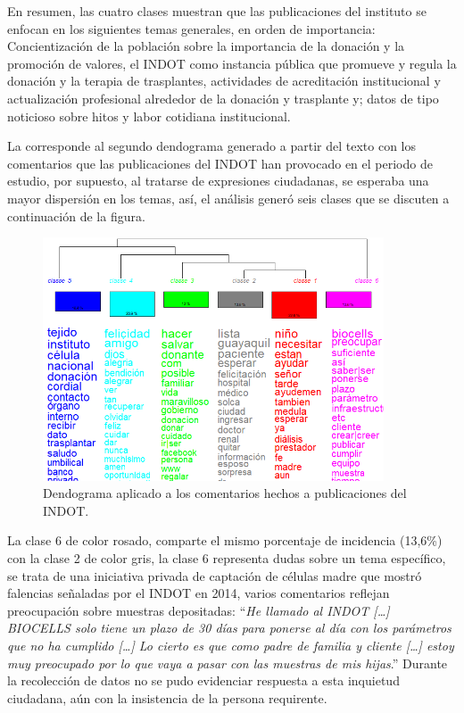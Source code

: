 \documentclass[spanish]{textolivre}
\begin{document}
En resumen, las cuatro clases muestran que las publicaciones del instituto se enfocan en los siguientes temas generales, en orden de importancia: Concientización de la población sobre la importancia de la donación y la promoción de valores, el INDOT como instancia pública que promueve y regula la donación y la terapia de trasplantes, actividades de acreditación institucional y actualización profesional alrededor de la donación y trasplante y; datos de tipo noticioso sobre hitos y labor cotidiana institucional.

La  corresponde al segundo dendograma generado a partir del texto con los comentarios que las publicaciones del INDOT han provocado en el periodo de estudio, por supuesto, al tratarse de expresiones ciudadanas, se esperaba una mayor dispersión en los temas, así, el análisis generó seis clases que se discuten a continuación de la figura.

\begin{figure}[htbp]
 \centering
 \includegraphics[width=0.9\textwidth]{figure02.png}
 \caption{Dendograma aplicado a los comentarios hechos a publicaciones del INDOT.}
 \label{fig2}
\end{figure}
 
La clase 6 de color rosado, comparte el mismo porcentaje de incidencia (13,6\%) con la clase 2 de color gris, la clase 6 representa dudas sobre un tema específico, se trata de una iniciativa privada de captación de células madre que mostró falencias señaladas por el INDOT en 2014, varios comentarios reflejan preocupación sobre muestras depositadas: “\emph{He llamado al INDOT […] BIOCELLS solo tiene un plazo de 30 días para ponerse al día con los parámetros que no ha cumplido […] Lo cierto es que como padre de familia y cliente […] estoy muy preocupado por lo que vaya a pasar con las muestras de mis hijas}.” Durante la recolección de datos no se pudo evidenciar respuesta a esta inquietud ciudadana, aún con la insistencia de la persona requirente. 
\end{document}
